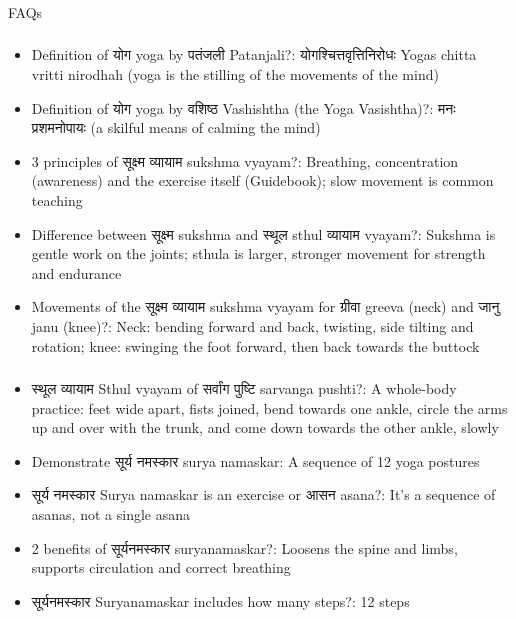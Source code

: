 \begin{frame}[fragile]\frametitle{}
\begin{center}
{\Large FAQs}
\end{center}
\end{frame}

\begin{frame}[fragile]\frametitle{}
\begin{itemize}
\item Definition of योग yoga by पतंजली Patanjali?: योगश्चित्तवृत्तिनिरोधः Yogas chitta vritti nirodhah (yoga is the stilling of the movements of the mind)
\item Definition of योग  yoga by वशिष्ठ  Vashishtha (the Yoga Vasishtha)?: मनः प्रशमनोपायः  (a skilful means of calming the mind)
\item 3 principles of सूक्ष्म व्यायाम sukshma vyayam?: Breathing, concentration (awareness) and the exercise itself (Guidebook); slow movement is common teaching
\item Difference between सूक्ष्म sukshma and स्थूल sthul व्यायाम vyayam?: Sukshma is gentle work on the joints; sthula is larger, stronger movement for strength and endurance
\item Movements of the सूक्ष्म व्यायाम sukshma vyayam for ग्रीवा greeva (neck) and जानु janu (knee)?: Neck: bending forward and back, twisting, side tilting and rotation; knee: swinging the foot forward, then back towards the buttock
\end{itemize}
\end{frame}

\begin{frame}[fragile]\frametitle{}
\begin{itemize}
\item स्थूल व्यायाम Sthul vyayam of सर्वांग पुष्टि sarvanga pushti?: A whole-body practice: feet wide apart, fists joined, bend towards one ankle, circle the arms up and over with the trunk, and come down towards the other ankle, slowly
\item Demonstrate सूर्य नमस्कार surya namaskar: A sequence of 12 yoga postures
\item सूर्य नमस्कार Surya namaskar is an exercise or आसन asana?: It's a sequence of asanas, not a single asana
\item 2 benefits of सूर्यनमस्कार suryanamaskar?: Loosens the spine and limbs, supports circulation and correct breathing
\item सूर्यनमस्कार Suryanamaskar includes how many steps?: 12 steps
\end{itemize}
\end{frame}

